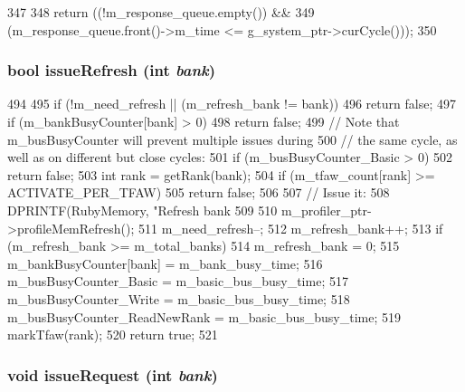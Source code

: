 \begin{DoxyCode}
347 {
348     return ((!m_response_queue.empty()) &&
349             (m_response_queue.front()->m_time <= g_system_ptr->curCycle()));
350 }
\end{DoxyCode}
\hypertarget{classRubyMemoryControl_a3907d2ad8de317b5d9488e567b8c29de}{
\subsubsection[{issueRefresh}]{\setlength{\rightskip}{0pt plus 5cm}bool issueRefresh (int {\em bank})}}
\label{classRubyMemoryControl_a3907d2ad8de317b5d9488e567b8c29de}



\begin{DoxyCode}
494 {
495     if (!m_need_refresh || (m_refresh_bank != bank))
496         return false;
497     if (m_bankBusyCounter[bank] > 0)
498         return false;
499     // Note that m_busBusyCounter will prevent multiple issues during
500     // the same cycle, as well as on different but close cycles:
501     if (m_busBusyCounter_Basic > 0)
502         return false;
503     int rank = getRank(bank);
504     if (m_tfaw_count[rank] >= ACTIVATE_PER_TFAW)
505         return false;
506 
507     // Issue it:
508     DPRINTF(RubyMemory, "Refresh bank %
509 
510     m_profiler_ptr->profileMemRefresh();
511     m_need_refresh--;
512     m_refresh_bank++;
513     if (m_refresh_bank >= m_total_banks)
514         m_refresh_bank = 0;
515     m_bankBusyCounter[bank] = m_bank_busy_time;
516     m_busBusyCounter_Basic = m_basic_bus_busy_time;
517     m_busBusyCounter_Write = m_basic_bus_busy_time;
518     m_busBusyCounter_ReadNewRank = m_basic_bus_busy_time;
519     markTfaw(rank);
520     return true;
521 }
\end{DoxyCode}
\hypertarget{classRubyMemoryControl_a9dbeedd7a40a225736f517e46ef9915e}{
\subsubsection[{issueRequest}]{\setlength{\rightskip}{0pt plus 5cm}void issueRequest (int {\em bank})}}
\label{classRubyMemoryControl_a9dbeedd7a40a225736f517e46ef9915e}



